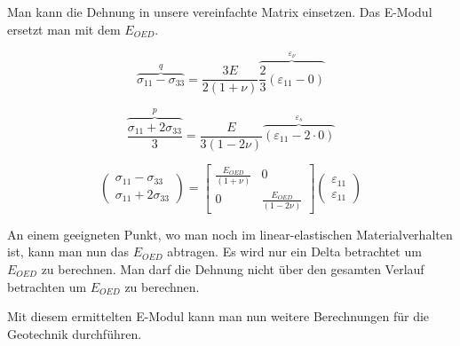 Man kann die Dehnung in unsere vereinfachte Matrix einsetzen. Das E-Modul ersetzt man mit dem $E_{OED}$.

\[
\overbrace{\sigma_{11}-\sigma_{33}}^{q}
=
\frac{3E}{2(1+\nu)} \overbrace{\frac{2}{3}(\varepsilon_{11} - 0)}^{\varepsilon_{\nu}}
\]

\[
\overbrace{\frac{\sigma_{11}+2\sigma_{33}}{3}}^{p}
=
\frac{E}{3(1-2\nu)} \overbrace{(\varepsilon_{11} - 2\cdot0)}^{\varepsilon_{s}}
\]

\[
\begin{pmatrix}
	\sigma_{11}-\sigma_{33} \\
	\sigma_{11}+2\sigma_{33}
\end{pmatrix}
=
\begin{bmatrix}
	\frac{E_{OED}}{(1+\nu)} &                        0 \\
	                      0 & \frac{E_{OED}}{(1-2\nu)}
\end{bmatrix}
\begin{pmatrix}
	\varepsilon_{11}\\
	\varepsilon_{11}
\end{pmatrix}
\]

An einem geeigneten Punkt, wo man noch im linear-elastischen Materialverhalten ist, kann man nun das $E_{OED}$ abtragen.
Es wird nur ein Delta betrachtet um $E_{OED}$ zu berechnen.
Man darf die Dehnung nicht über den gesamten Verlauf betrachten um $E_{OED}$ zu berechnen.

Mit diesem ermittelten E-Modul kann man nun weitere Berechnungen für die Geotechnik durchführen.

